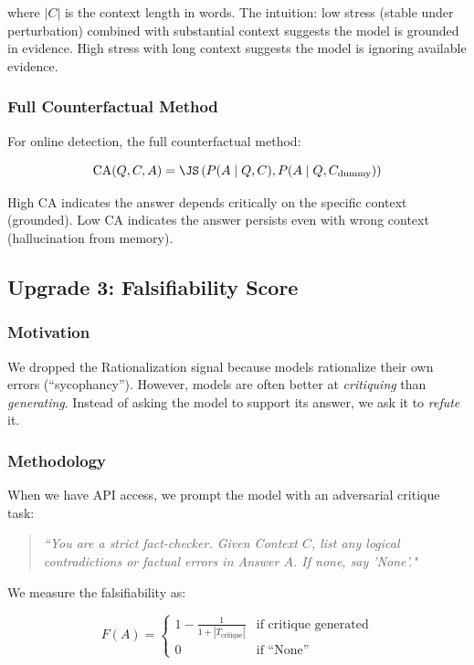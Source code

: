 where $|C|$ is the context length in words. The intuition: low stress (stable under perturbation) combined with substantial context suggests the model is grounded in evidence. High stress with long context suggests the model is ignoring available evidence.

\subsubsection{Full Counterfactual Method}
For online detection, the full counterfactual method:

\begin{equation}
    \text{CA}(Q, C, A) = \JS\left( P(A \mid Q, C), P(A \mid Q, C_{\text{dummy}}) \right)
\end{equation}

High CA indicates the answer depends critically on the specific context (grounded). Low CA indicates the answer persists even with wrong context (hallucination from memory).

\subsection{Upgrade 3: Falsifiability Score}

\subsubsection{Motivation}
We dropped the Rationalization signal because models rationalize their own errors (``sycophancy''). However, models are often better at \textit{critiquing} than \textit{generating}. Instead of asking the model to support its answer, we ask it to \textit{refute} it.

\subsubsection{Methodology}
When we have API access, we prompt the model with an adversarial critique task:

\begin{quote}
\textit{``You are a strict fact-checker. Given Context $C$, list any logical contradictions or factual errors in Answer $A$. If none, say 'None'."}
\end{quote}

We measure the falsifiability as:

\begin{equation}
    F(A) = \begin{cases}
        1 - \frac{1}{1 + |T_{\text{critique}}|} & \text{if critique generated} \\
        0 & \text{if ``None''}
    \end{cases}
\end{equation}

